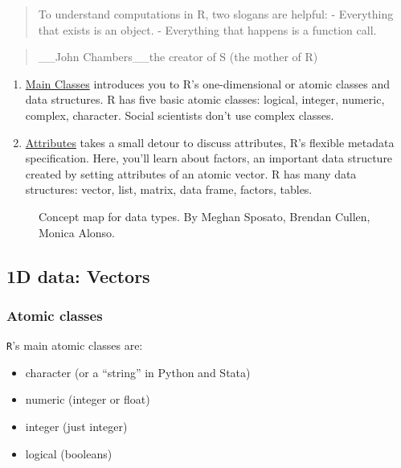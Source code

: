 \documentclass[
]{book}
\providecommand{\tightlist}{%
  \setlength{\itemsep}{0pt}\setlength{\parskip}{0pt}}
\begin{document}
\begin{quote}
To understand computations in R, two slogans are helpful:
- Everything that exists is an object.
- Everything that happens is a function call.
\end{quote}

\begin{quote}
\_\_John Chambers\_\_the creator of S (the mother of R)
\end{quote}

\begin{enumerate}
\def\labelenumi{\arabic{enumi}.}
\item
  \hyperref[main-classes]{Main Classes} introduces you to R's one-dimensional or atomic classes and data structures. R has five basic atomic classes: logical, integer, numeric, complex, character. Social scientists don't use complex classes.
\item
  \hyperref[attributes]{Attributes} takes a small detour to discuss attributes, R's flexible metadata specification. Here, you'll learn about factors, an important data structure created by setting attributes of an atomic vector. R has many data structures: vector, list, matrix, data frame, factors, tables.
\end{enumerate}

\begin{figure}
\centering

\caption{Concept map for data types. By Meghan Sposato, Brendan Cullen, Monica Alonso.}
\end{figure}

\subsection{1D data: Vectors}\label{d-data-vectors}

\subsubsection{Atomic classes}\label{atomic-classes}

\texttt{R}'s main atomic classes are:

\begin{itemize}
\tightlist
\item
  character (or a ``string'' in Python and Stata)
\item
  numeric (integer or float)
\item
  integer (just integer)
\item
  logical (booleans)
\end{itemize}
\end{document}
